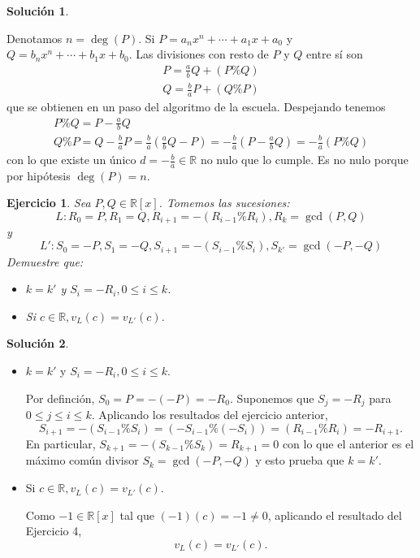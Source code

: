 \documentclass[10pt]{article}
\newtheorem{ejer}{Ejercicio}
\theoremstyle{definition}
\newtheorem*{sol}{Solución}
\newcommand{\RR}{\mathbb{R}}
\newcommand{\RRx}{\mathbb{R}[x]}
\begin{document}
\begin{sol}
\begin{itemize}
    Denotamos $n = \deg(P)$. Si $P = a_nx^n+\cdots+a_1x+a_0$ y $Q = b_nx^n+\cdots+b_1x+b_0$. Las divisiones con resto de $P$ y $Q$ entre sí son
    \[\begin{array}{l}
        P = \frac{a}{b}Q+(P\% Q)\\
        Q = \frac{b}{a}P+(Q\% P)
    \end{array}
    \]
    que se obtienen en un paso del algoritmo de la escuela. Despejando tenemos
    \[\begin{array}{l}
        P\% Q = P-\frac{a}{b}Q\\
        Q\% P = Q-\frac{b}{a}P=\frac{b}{a}\left(\frac{a}{b}Q-P\right)=-\frac{b}{a}\left(P-\frac{a}{b}Q\right)=-\frac{b}{a}(P\% Q)
    \end{array}
    \]
    con lo que existe un único $d=-\frac{b}{a}\in\RR$ no nulo que lo cumple. Es no nulo porque por hipótesis $\deg(P)=n$.
\end{itemize}
\end{sol}

\begin{ejer} Sea $P,Q\in\RRx$. Tomemos las sucesiones:
\[L: R_0=P,R_1=Q,R_{i+1}=-(R_{i-1}\% R_i),R_k=\gcd(P,Q)\]
y
\[L':S_0=-P,S_1=-Q,S_{i+1}=-(S_{i-1}\% S_i),S_{k'}=\gcd(-P,-Q)\]
Demuestre que:
\begin{itemize}
    \item $k=k'$ y $S_i=-R_i,0\leq i\leq k$.
    \item Si $c\in\RR,v_L(c)=v_{L'}(c)$.
\end{itemize}
\end{ejer}
\begin{sol}\leavevmode
\begin{itemize}
    \item $k=k'$ y $S_i=-R_i,0\leq i\leq k$.
    
    Por definción, $S_0=P=-(-P)=-R_0$. Suponemos que $S_j=-R_j$ para $0\leq j\leq i\leq k$. Aplicando los resultados del ejercicio anterior, 
    \[S_{i+1}=-(S_{i-1}\%S_i)=(-S_{i-1}\%(-S_i))=(R_{i-1}\%R_i)=-R_{i+1}.\]
    En particular, $S_{k+1}=-(S_{k-1}\% S_k)=R_{k+1}=0$ con lo que el anterior es el máximo común divisor $S_k=\gcd(-P,-Q)$ y esto prueba que $k=k'$.
    \item Si $c\in\RR,v_L(c)=v_{L'}(c)$.
    
    Como $-1\in\RRx$ tal que $(-1)(c)=-1\neq 0$, aplicando el resultado del Ejercicio 4, \[v_L(c)=v_{L'}(c).\]
\end{itemize}
\end{sol}
\end{document}
